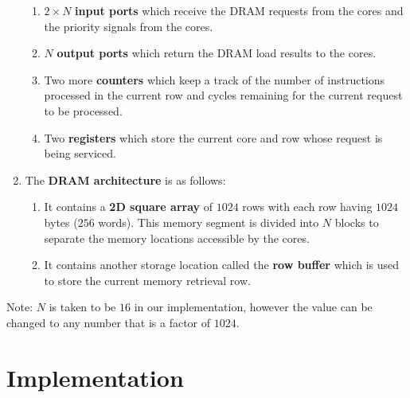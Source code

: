 \documentclass{article}
\begin{document}
\begin{enumerate}
\begin{enumerate}
            \item $2\times N$ \textbf{input ports} which receive the DRAM requests from the cores and the priority signals from the cores.
            \item $N$ \textbf{output ports} which return the DRAM load results to the cores.
            \item Two more \textbf{counters} which keep a track of the number of instructions processed in the current row and cycles remaining for the current request to be processed.
            \item Two \textbf{registers} which store the current core and row whose request is being serviced.
        \end{enumerate}
    \item The \textbf{DRAM architecture} is as follows:
        \begin{enumerate}
            \item It contains a \textbf{2D square array} of $1024$ rows with each row having $1024$ bytes ($256$ words). This memory segment is divided into $N$ blocks to separate the memory locations accessible by the cores.
            \item It contains another storage location called the \textbf{row buffer} which is used to store the current memory retrieval row.
        \end{enumerate}
\end{enumerate}
Note: $N$ is taken to be $16$ in our implementation, however the value can be changed to any number that is a factor of $1024$.


\section{Implementation}

\end{document}
